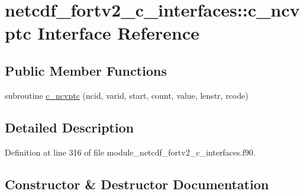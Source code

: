 \hypertarget{interfacenetcdf__fortv2__c__interfaces_1_1c__ncvptc}{}\section{netcdf\+\_\+fortv2\+\_\+c\+\_\+interfaces\+:\+:c\+\_\+ncvptc Interface Reference}
\label{interfacenetcdf__fortv2__c__interfaces_1_1c__ncvptc}
\subsection*{Public Member Functions}
\begin{DoxyCompactItemize}
\item 
subroutine \hyperlink{interfacenetcdf__fortv2__c__interfaces_1_1c__ncvptc_a8d1654cef9ae4a785ffb394472b7df5e}{c\+\_\+ncvptc} (ncid, varid, start, count, value, lenstr, rcode)
\end{DoxyCompactItemize}


\subsection{Detailed Description}


Definition at line 316 of file module\+\_\+netcdf\+\_\+fortv2\+\_\+c\+\_\+interfaces.\+f90.



\subsection{Constructor \& Destructor Documentation}
\mbox{\label{interfacenetcdf__fortv2__c__interfaces_1_1c__ncvptc_a8d1654cef9ae4a785ffb394472b7df5e}} 
